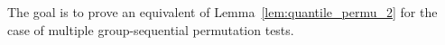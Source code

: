 \documentclass{article}
\theoremstyle{plain}
\newtheorem{Lemma}{Lemma}
\theoremstyle{remark}
\renewcommand{\S}{\mathfrak{S}}
\newcommand{\1}{\mathbbm{1}}
\newcommand{\id}{\mathrm{id}}
\numberwithin{equation}{section}
\begin{document}
The goal is to prove an equivalent of Lemma~\ref{lem:quantile_permu_2} for the case of multiple group-sequential permutation tests.




\end{document}
